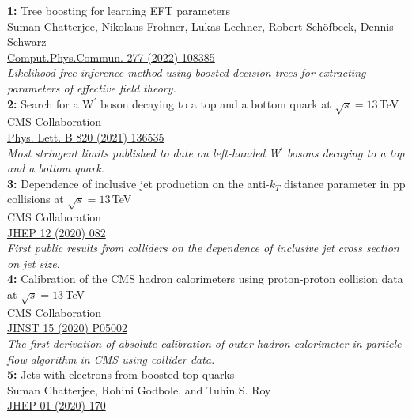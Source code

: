 \documentclass[a4paper,11pt]{article}
\begin{document}
{\textbf{1:} {Tree boosting for learning EFT parameters}\\
Suman Chatterjee, Nikolaus Frohner, Lukas Lechner, Robert Sch{\"o}fbeck, Dennis Schwarz\\
\href{https://doi.org/10.1016/j.cpc.2022.108385}{Comput.Phys.Commun. 277 (2022) 108385}\\
\textit{Likelihood-free inference method using boosted decision trees for extracting parameters of effective field theory.}\\
\textbf{2:} {
Search for a W$^\prime$ boson decaying to a top and a bottom quark at $\sqrt{s}=13$\,TeV}\\
CMS Collaboration \\
\href{https://doi.org/10.1016/j.physletb.2021.136535}{Phys. Lett. B 820 (2021) 136535} \\
\textit{Most stringent limits published to date on left-handed W$^\prime$ bosons decaying to a top and a bottom quark.}\\
\textbf{3:} {
Dependence of inclusive jet production on the anti$\mbox{-}k_T$ distance parameter in pp collisions at $\sqrt{s} = 13$\,TeV}\\
CMS Collaboration \\
\href{https://doi.org/10.1007/JHEP12(2020)082}{JHEP 12 (2020) 082}\\
\textit{First public results from colliders on the dependence of inclusive jet cross section on jet size.}\\
\textbf{4:} {Calibration of the CMS hadron calorimeters using proton-proton collision data at $\sqrt{s}= 13$\,TeV}\\
CMS Collaboration \\
\href{https://doi.org/10.1088/1748-0221/15/05/P05002}{JINST 15 (2020) P05002}\\
\textit{The first derivation of absolute calibration of outer hadron calorimeter in particle-flow algorithm in CMS using collider data.}\\
\textbf{5:} {Jets with electrons from boosted top quarks}\\
Suman Chatterjee, Rohini Godbole, and Tuhin S. Roy\\
\href{https://doi.org/10.1007/JHEP01(2020)170}{JHEP 01 (2020) 170}\\
}
\end{document}
